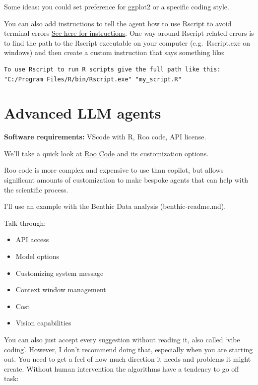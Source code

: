 \documentclass[
  letterpaper,
  DIV=11,
  numbers=noendperiod]{scrreprt}
\providecommand{\tightlist}{%
  \setlength{\itemsep}{0pt}\setlength{\parskip}{0pt}}\usepackage{longtable,booktabs,array}
\begin{document}
Some ideas: you could set preference for ggplot2 or a specific coding
style.

You can also add instructions to tell the agent how to use Rscript to
avoid terminal errors
\href{https://docs.github.com/en/copilot/customizing-copilot/adding-repository-custom-instructions-for-github-copilot}{See
here for instructions}. One way around Rscript related errors is to find
the path to the Rscript executable on your computer (e.g.~Rscript.exe on
windows) and then create a custom instruction that says something like:

\begin{verbatim}
To use Rscript to run R scripts give the full path like this: 
"C:/Program Files/R/bin/Rscript.exe" "my_script.R"
\end{verbatim}


\chapter{Advanced LLM agents}\label{advanced-llm-agents}

\textbf{Software requirements:} VScode with R, Roo code, API license.

We'll take a quick look at \href{https://docs.roocode.com/}{Roo Code}
and its customization options.

Roo code is more complex and expensive to use than copilot, but allows
significant amounts of customization to make bespoke agents that can
help with the scientific process.

I'll use an example with the Benthic Data analysis (benthic-readme.md).

Talk through:

\begin{itemize}
\tightlist
\item
  API access
\item
  Model options
\item
  Customizing system message
\item
  Context window management
\item
  Cost
\item
  Vision capabilities
\end{itemize}

You can also just accept every suggestion without reading it, also
called `vibe coding'. However, I don't recommend doing that, especially
when you are starting out. You need to get a feel of how much direction
it needs and problems it might create. Without human intervention the
algorithms have a tendency to go off task:
\end{document}
